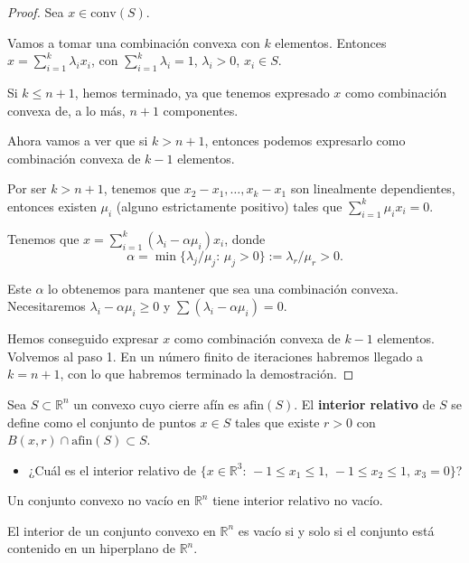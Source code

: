 \begin{proof}
Sea $x\in\mbox{conv}(S)$. 

Vamos a tomar una combinación convexa con $k$ elementos. Entonces $x=\sum_{i=1}^{k}\lambda_i x_i$, con $\sum_{i=1}^{k}\lambda_i=1$, $\lambda_i> 0$, $x_i\in S$. 


Si $k\leq n+1$, hemos terminado, ya que tenemos expresado $x$ como combinación convexa de, a lo más, $n+1$ componentes. 

Ahora vamos a ver que si $k > n+1$, entonces podemos expresarlo como combinación convexa de $k-1$ elementos. 

Por ser $k>n+1$, tenemos que $x_2-x_1,\ldots, x_k-x_1$ son linealmente dependientes, entonces existen $\mu_i$ (alguno estrictamente positivo) tales que $\sum_{i=1}^{k}\mu_i x_i=0$.

 Tenemos que $x=\sum_{i=1}^k (\lambda_i-\alpha\mu_i)x_i$, donde
\[
\alpha = \min\{\lambda_j/\mu_j:\, \mu_j>0\}:=\lambda_r/\mu_r > 0.
\]

Este $\alpha$ lo obtenemos para mantener que sea una combinación convexa. Necesitaremos $λ_i - \alpha μ_i \geq 0$ y $\sum (λ_i -\alpha μ_i) = 0$.

Hemos conseguido expresar $x$ como combinación convexa de $k-1$ elementos. Volvemos al paso 1. En un número finito de iteraciones habremos llegado a $k = n+1$, con lo que habremos terminado la demostración.
\end{proof}



Sea $S\subset\mathbb{R}^n$ un convexo cuyo cierre afín es $\mbox{afin}(S)$. El \textbf{interior relativo} de $S$ se define como el conjunto de puntos $x\in S$ tales que existe $r>0$ con $B(x,r)\cap \mbox{afin}(S) \subset S$.

\begin{itemize}
\item ¿Cuál es el interior relativo de $\{x\in \mathbb{R}^3:\, -1\leq x_1\leq 1,\, -1\leq x_2\leq 1,\, x_3=0\}$?
\end{itemize}



\begin{theorem} 
Un conjunto convexo no vacío en $\mathbb{R}^n$ tiene interior relativo no vacío.
\end{theorem}


\begin{theorem} 
El interior de un conjunto convexo  en $\mathbb{R}^n$ es vacío si y solo si el conjunto está contenido en un hiperplano de $\mathbb{R}^n$.
\end{theorem}

